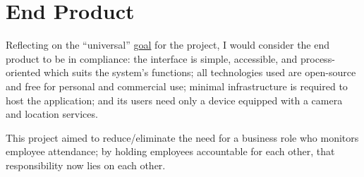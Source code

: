 \section{End Product}

Reflecting on the \enquote{universal}
\hyperref[ss:goal]{goal} for the project, I would consider
the end product to be in compliance: the interface is
simple, accessible, and process-oriented which suits the
system's functions; all technologies used are open-source
and free for personal and commercial use; minimal
infrastructure is required to host the application; and its
users need only a device equipped with a camera and
location services.

This project aimed to reduce/eliminate the need for a
business role who monitors employee attendance; by holding
employees accountable for each other, that responsibility
now lies on each other. 